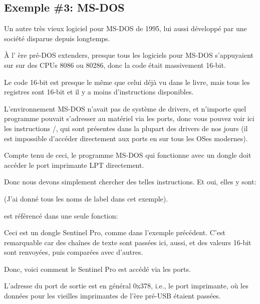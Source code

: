 \subsection{Exemple \#3: MS-DOS}
\label{dongle_16bit_dos}

Un autre très vieux logiciel pour MS-DOS de 1995, lui aussi développé par une société
disparue depuis longtemps.


À l' ère pré-DOS extenders, presque tous les logiciels pour MS-DOS s'appuyaient sur
sur des CPUs 8086 ou 80286, donc la code était massivement 16-bit.

Le code 16-bit est presque le même que celui déjà vu dans le livre, mais tous les
registres sont 16-bit et il y a moins d'instructions disponibles.

\label{IN_example}
\label{OUT_example}

L'environnement MS-DOS n'avait pas de système de drivers, et n'importe quel programme
pouvait s'adresser au matériel via les ports, donc vous pouvez voir ici les instructions
/, qui sont présentes dans la plupart des drivers de nos jours (il
est impossible d'accéder directement aux ports en 
sur tous les \ac{OS}es modernes).

Compte tenu de ceci, le programme MS-DOS qui fonctionne avec un dongle doit accéder
le port imprimante LPT directement.

Donc nous devons simplement chercher des telles instructions. Et oui, elles y sont:



(J'ai donné tous les noms de label dans cet exemple).

 est référencé dans une seule fonction:



Ceci est un  dongle Sentinel Pro, comme dans l'exemple précédent.
C'est remarquable car des chaînes de texte sont passées ici, aussi, et des valeurs 16-bit
sont renvoyées, puis comparées avec d'autres.

Donc, voici comment le Sentinel Pro est accédé via les ports.

L'adresse du port de sortie est en général 0x378, i.e., le port imprimante, où les
données pour les vieilles imprimantes de l'ère pré-USB étaient passées.

